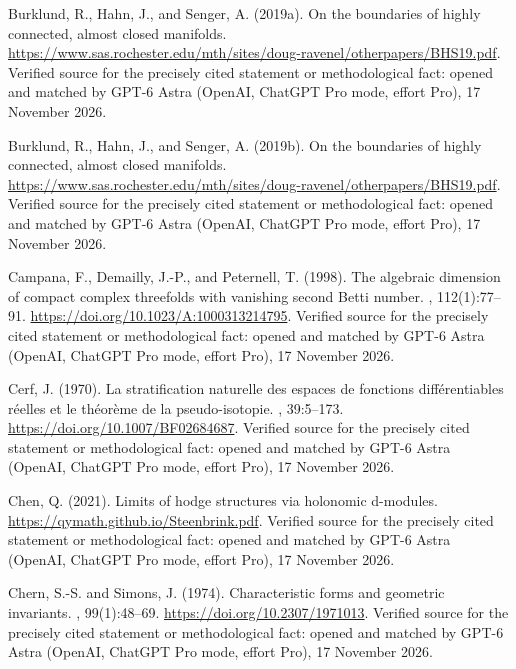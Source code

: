 \begin{thebibliography}{}
Burklund, R., Hahn, J., and Senger, A. (2019a).
\newblock On the boundaries of highly connected, almost closed manifolds.
\newblock \url{https://www.sas.rochester.edu/mth/sites/doug-ravenel/otherpapers/BHS19.pdf}. Verified source for the precisely cited statement or methodological fact: opened and matched by GPT-6 Astra (OpenAI, ChatGPT Pro mode, effort Pro), 17 November 2026.

Burklund, R., Hahn, J., and Senger, A. (2019b).
\newblock On the boundaries of highly connected, almost closed manifolds.
\newblock \url{https://www.sas.rochester.edu/mth/sites/doug-ravenel/otherpapers/BHS19.pdf}. Verified source for the precisely cited statement or methodological fact: opened and matched by GPT-6 Astra (OpenAI, ChatGPT Pro mode, effort Pro), 17 November 2026.

Campana, F., Demailly, J.-P., and Peternell, T. (1998).
\newblock The algebraic dimension of compact complex threefolds with vanishing
  second {Betti} number.
, 112(1):77--91.
\newblock \url{https://doi.org/10.1023/A:1000313214795}. Verified source for the precisely cited statement or methodological fact: opened and matched by GPT-6 Astra (OpenAI, ChatGPT Pro mode, effort Pro), 17 November 2026.

Cerf, J. (1970).
\newblock La stratification naturelle des espaces de fonctions
  diff{\'e}rentiables r{\'e}elles et le th{\'e}or{\`e}me de la pseudo-isotopie.
, 39:5--173.
\newblock \url{https://doi.org/10.1007/BF02684687}. Verified source for the precisely cited statement or methodological fact: opened and matched by GPT-6 Astra (OpenAI, ChatGPT Pro mode, effort Pro), 17 November 2026.

Chen, Q. (2021).
\newblock Limits of hodge structures via holonomic d-modules.
\newblock \url{https://qymath.github.io/Steenbrink.pdf}. Verified source for the precisely cited statement or methodological fact: opened and matched by GPT-6 Astra (OpenAI, ChatGPT Pro mode, effort Pro), 17 November 2026.

Chern, S.-S. and Simons, J. (1974).
\newblock Characteristic forms and geometric invariants.
, 99(1):48--69.
\newblock \url{https://doi.org/10.2307/1971013}. Verified source for the precisely cited statement or methodological fact: opened and matched by GPT-6 Astra (OpenAI, ChatGPT Pro mode, effort Pro), 17 November 2026.


\end{thebibliography}
